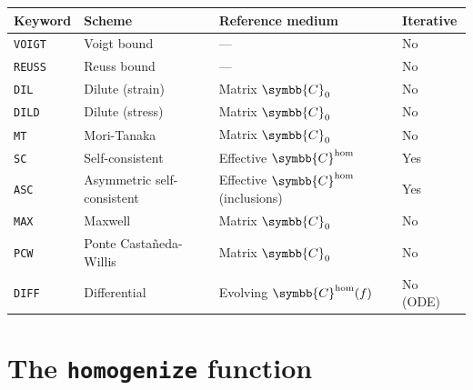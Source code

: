 \documentclass[
  a4paper,
  numbers=noendperiod,
  DIV=12]{scrreprt}
\newcounter{none} %
\newcommand{\uuuu}[1]{{\symbb{{#1}}}}
\begin{document}
{\def\LTcaptype{none} %
\begin{longtable}[]{@{}
  >{\raggedright\arraybackslash}p{}
  >{\raggedright\arraybackslash}p{}
  >{\raggedright\arraybackslash}p{}
  >{\raggedright\arraybackslash}p{}@{}}
\toprule\noalign{}
\begin{minipage}[b]{\linewidth}\raggedright
Keyword
\end{minipage} & \begin{minipage}[b]{\linewidth}\raggedright
Scheme
\end{minipage} & \begin{minipage}[b]{\linewidth}\raggedright
Reference medium
\end{minipage} & \begin{minipage}[b]{\linewidth}\raggedright
Iterative
\end{minipage} \\
\midrule\noalign{}
\endhead
\bottomrule\noalign{}
\endlastfoot
\texttt{VOIGT} & Voigt bound & --- & No \\
\texttt{REUSS} & Reuss bound & --- & No \\
\texttt{DIL} & Dilute (strain) & Matrix \(\uuuu{C}_0\) & No \\
\texttt{DILD} & Dilute (stress) & Matrix \(\uuuu{C}_0\) & No \\
\texttt{MT} & Mori-Tanaka & Matrix \(\uuuu{C}_0\) & No \\
\texttt{SC} & Self-consistent & Effective \(\uuuu{C}^\textrm{hom}\) &
Yes \\
\texttt{ASC} & Asymmetric self-consistent & Effective
\(\uuuu{C}^\textrm{hom}\) (inclusions) & Yes \\
\texttt{MAX} & Maxwell & Matrix \(\uuuu{C}_0\) & No \\
\texttt{PCW} & Ponte Castañeda-Willis & Matrix \(\uuuu{C}_0\) & No \\
\texttt{DIFF} & Differential & Evolving \(\uuuu{C}^\textrm{hom}(f)\) &
No (ODE) \\
\end{longtable}
}

\section{\texorpdfstring{The \texttt{homogenize}
function}{The homogenize function}}\label{sec-homogenize-function}
\end{document}
